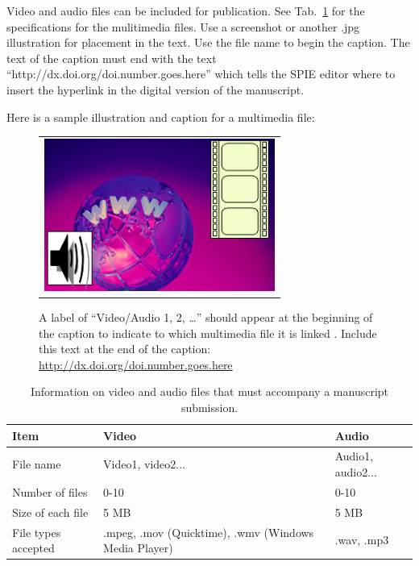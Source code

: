 Video and audio files can be included for publication. See Tab.~\ref{tab:Multimedia-Specifications} for the specifications for the mulitimedia files. Use a screenshot or another .jpg illustration for placement in the text. Use the file name to begin the caption. The text of the caption must end with the text ``http://dx.doi.org/doi.number.goes.here'' which tells the SPIE editor where to insert the hyperlink in the digital version of the manuscript.

Here is a sample illustration and caption for a multimedia file:

   \begin{figure} [ht]
   \begin{center}
   \begin{tabular}{c}
   \includegraphics[height=5cm]{MultimediaFigure.jpg}
	\end{tabular}
	\end{center}
   \caption[example]
   { \label{fig:video-example}
A label of “Video/Audio 1, 2, …” should appear at the beginning of the caption to indicate to which multimedia file it is linked . Include this text at the end of the caption: \url{http://dx.doi.org/doi.number.goes.here}}
   \end{figure}

   \begin{table}[ht]
\caption{Information on video and audio files that must accompany a manuscript submission.}
\label{tab:Multimedia-Specifications}
\begin{center}
\begin{tabular}{|l|l|l|}
\hline
\rule[-1ex]{0pt}{3.5ex}  Item & Video & Audio  \\
\hline
\rule[-1ex]{0pt}{3.5ex}  File name & Video1, video2... & Audio1, audio2...   \\
\hline
\rule[-1ex]{0pt}{3.5ex}  Number of files & 0-10 & 0-10  \\
\hline
\rule[-1ex]{0pt}{3.5ex}  Size of each file & 5 MB & 5 MB  \\
\hline
\rule[-1ex]{0pt}{3.5ex}  File types accepted & .mpeg, .mov (Quicktime), .wmv (Windows Media Player) & .wav, .mp3  \\
\hline
\end{tabular}
\end{center}
\end{table}

